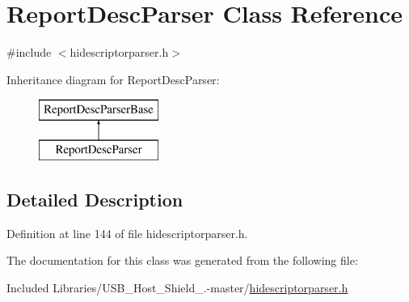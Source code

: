 \hypertarget{class_report_desc_parser}{\section{\-Report\-Desc\-Parser \-Class \-Reference}
\label{class_report_desc_parser}
}


{\ttfamily \#include $<$hidescriptorparser.\-h$>$}

\-Inheritance diagram for \-Report\-Desc\-Parser\-:\begin{figure}[H]
\begin{center}
\leavevmode
\includegraphics[height=2.000000cm]{class_report_desc_parser}
\end{center}
\end{figure}


\subsection{\-Detailed \-Description}


\-Definition at line 144 of file hidescriptorparser.\-h.



\-The documentation for this class was generated from the following file\-:\begin{DoxyCompactItemize}
\item 
\-Included Libraries/\-U\-S\-B\-\_\-\-Host\-\_\-\-Shield\-\_.-\/master/\hyperlink{hidescriptorparser_8h}{hidescriptorparser.\-h}\end{DoxyCompactItemize}
